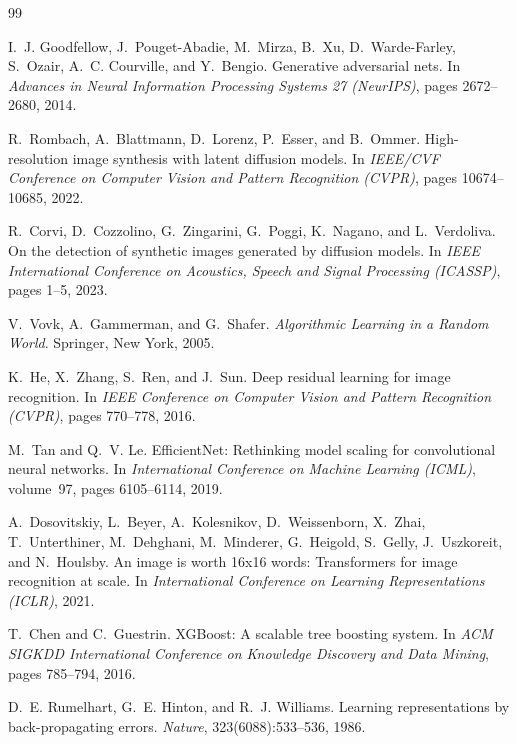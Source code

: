\documentclass[12pt,a4paper]{book}
\theoremstyle{definition}
\theoremstyle{remark}
\begin{document}
\begin{thebibliography}{99}

I.~J. Goodfellow, J.~Pouget-Abadie, M.~Mirza, B.~Xu, D.~Warde-Farley, S.~Ozair, A.~C. Courville, and Y.~Bengio.
\newblock Generative adversarial nets.
\newblock In \emph{Advances in Neural Information Processing Systems 27 (NeurIPS)}, pages 2672--2680, 2014.

R.~Rombach, A.~Blattmann, D.~Lorenz, P.~Esser, and B.~Ommer.
\newblock High-resolution image synthesis with latent diffusion models.
\newblock In \emph{IEEE/CVF Conference on Computer Vision and Pattern Recognition (CVPR)}, pages 10674--10685, 2022.

R.~Corvi, D.~Cozzolino, G.~Zingarini, G.~Poggi, K.~Nagano, and L.~Verdoliva.
\newblock On the detection of synthetic images generated by diffusion models.
\newblock In \emph{IEEE International Conference on Acoustics, Speech and Signal Processing (ICASSP)}, pages 1--5, 2023.

V.~Vovk, A.~Gammerman, and G.~Shafer.
\newblock \emph{Algorithmic Learning in a Random World}.
\newblock Springer, New York, 2005.

K.~He, X.~Zhang, S.~Ren, and J.~Sun.
\newblock Deep residual learning for image recognition.
\newblock In \emph{IEEE Conference on Computer Vision and Pattern Recognition (CVPR)}, pages 770--778, 2016.

M.~Tan and Q.~V. Le.
\newblock EfficientNet: Rethinking model scaling for convolutional neural networks.
\newblock In \emph{International Conference on Machine Learning (ICML)}, volume~97, pages 6105--6114, 2019.

A.~Dosovitskiy, L.~Beyer, A.~Kolesnikov, D.~Weissenborn, X.~Zhai, T.~Unterthiner, M.~Dehghani, M.~Minderer, G.~Heigold, S.~Gelly, J.~Uszkoreit, and N.~Houlsby.
\newblock An image is worth 16x16 words: Transformers for image recognition at scale.
\newblock In \emph{International Conference on Learning Representations (ICLR)}, 2021.

T.~Chen and C.~Guestrin.
\newblock XGBoost: A scalable tree boosting system.
\newblock In \emph{ACM SIGKDD International Conference on Knowledge Discovery and Data Mining}, pages 785--794, 2016.

D.~E. Rumelhart, G.~E. Hinton, and R.~J. Williams.
\newblock Learning representations by back-propagating errors.
\newblock \emph{Nature}, 323(6088):533--536, 1986.


\end{thebibliography}
\end{document}
